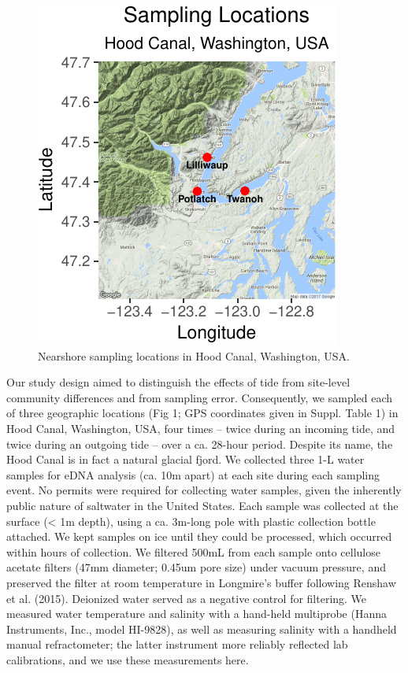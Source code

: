 \documentclass[fleqn,10pt,lineno]{wlpeerj} %
\begin{document}
\begin{figure}[!ht]

{\centering \includegraphics{figures/FIG1_sitemap-1} 

}

\caption{\label{fig:fig1}Nearshore sampling locations in Hood Canal, Washington, USA.}\label{fig:FIG1_sitemap}
\end{figure}

Our study design aimed to distinguish the effects of tide from
site-level community differences and from sampling error. Consequently,
we sampled each of three geographic locations (Fig 1; GPS coordinates
given in Suppl. Table 1) in Hood Canal, Washington, USA, four times --
twice during an incoming tide, and twice during an outgoing tide -- over
a ca. 28-hour period. Despite its name, the Hood Canal is in fact a
natural glacial fjord. We collected three 1-L water samples for eDNA
analysis (ca. 10m apart) at each site during each sampling event. No
permits were required for collecting water samples, given the inherently
public nature of saltwater in the United States. Each sample was
collected at the surface (\textless{} 1m depth), using a ca. 3m-long
pole with plastic collection bottle attached. We kept samples on ice
until they could be processed, which occurred within hours of
collection. We filtered 500mL from each sample onto cellulose acetate
filters (47mm diameter; 0.45um pore size) under vacuum pressure, and
preserved the filter at room temperature in Longmire's buffer following
Renshaw et al. (2015). Deionized water served as a negative control for
filtering. We measured water temperature and salinity with a hand-held
multiprobe (Hanna Instruments, Inc., model HI-9828), as well as
measuring salinity with a handheld manual refractometer; the latter
instrument more reliably reflected lab calibrations, and we use these
measurements here.
\end{document}
